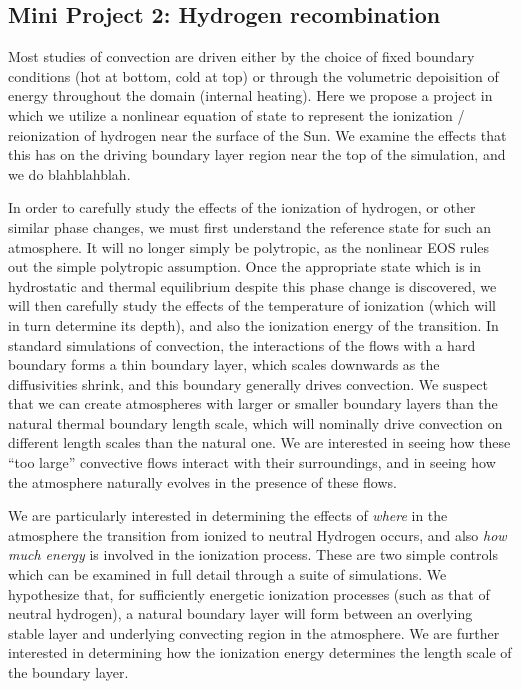 \documentclass[aasms,12pt]{article}
\begin{document}
\subsection{Mini Project 2: Hydrogen recombination}
Most studies of convection are driven either by the choice of fixed boundary conditions
(hot at bottom, cold at top) or through the volumetric depoisition of energy throughout
the domain (internal heating).  Here we propose a project in which we utilize a nonlinear
equation of state to represent the ionization / reionization of hydrogen near the surface of
the Sun.  We examine the effects that this has on the driving boundary layer region near the
top of the simulation, and we do blahblahblah.

In order to carefully study the effects of the ionization of hydrogen, or other similar phase
changes, we must first understand the reference state for such an atmosphere.  It will no longer
simply be polytropic, as the nonlinear EOS rules out the simple polytropic assumption. Once the
appropriate state which is in hydrostatic and thermal equilibrium despite this phase change is discovered,
we will then carefully study the effects of the temperature of ionization (which will in turn
determine its depth), and also the ionization energy of the transition.  In standard simulations
of convection, the interactions of the flows with a hard boundary forms a thin boundary layer,
which scales downwards as the diffusivities shrink, and this boundary generally drives convection.
We suspect that we can create atmospheres with larger or smaller boundary layers than the natural
thermal boundary length scale, which will nominally drive convection on different length scales
than the natural one.  We are interested in seeing how these ``too large'' convective flows
interact with their surroundings, and in seeing how the atmosphere naturally evolves in the presence
of these flows.

We are particularly interested in determining the effects of \emph{where} in the atmosphere the
transition from ionized to neutral Hydrogen occurs, and also \emph{how much energy} is involved in
the ionization process.  These are two simple controls which can be examined in full detail through
a suite of simulations.  We hypothesize that, for sufficiently energetic ionization processes (such as
that of neutral hydrogen), a natural boundary layer will form between an overlying stable layer and
underlying convecting region in the atmosphere.  We are further interested in determining how the
ionization energy determines the length scale of the boundary layer.
\end{document}
